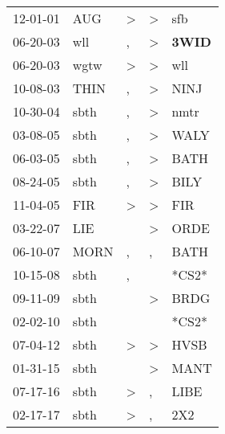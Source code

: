 \begin{supertabular}{p{0.07\textwidth}p{0.06\textwidth}p{0.02\textwidth}p{0.02\textwidth}p{0.06\textwidth}}
 12-01-01\textsuperscript{} &   AUG\textsuperscript{} &  \textgreater &  \textgreater &            sfb\textsuperscript{} \\
 06-20-03\textsuperscript{} &   wll\textsuperscript{} &             , &  \textgreater &  \textbf{3WID\textsuperscript{}} \\
 06-20-03\textsuperscript{} &  wgtw\textsuperscript{} &  \textgreater &  \textgreater &            wll\textsuperscript{} \\
 10-08-03\textsuperscript{} &  THIN\textsuperscript{} &             , &  \textgreater &           NINJ\textsuperscript{} \\
 10-30-04\textsuperscript{} &  sbth\textsuperscript{} &             , &  \textgreater &           nmtr\textsuperscript{} \\
 03-08-05\textsuperscript{} &  sbth\textsuperscript{} &             , &  \textgreater &           WALY\textsuperscript{} \\
 06-03-05\textsuperscript{} &  sbth\textsuperscript{} &             , &  \textgreater &           BATH\textsuperscript{} \\
 08-24-05\textsuperscript{} &  sbth\textsuperscript{} &             , &  \textgreater &           BILY\textsuperscript{} \\
 11-04-05\textsuperscript{} &   FIR\textsuperscript{} &  \textgreater &  \textgreater &            FIR\textsuperscript{} \\
 03-22-07\textsuperscript{} &   LIE\textsuperscript{} &               &  \textgreater &           ORDE\textsuperscript{} \\
 06-10-07\textsuperscript{} &  MORN\textsuperscript{} &             , &             , &           BATH\textsuperscript{} \\
 10-15-08\textsuperscript{} &  sbth\textsuperscript{} &             , &               &                            *CS2* \\
 09-11-09\textsuperscript{} &  sbth\textsuperscript{} &               &  \textgreater &           BRDG\textsuperscript{} \\
 02-02-10\textsuperscript{} &  sbth\textsuperscript{} &               &               &                            *CS2* \\
 07-04-12\textsuperscript{} &  sbth\textsuperscript{} &  \textgreater &  \textgreater &           HVSB\textsuperscript{} \\
 01-31-15\textsuperscript{} &  sbth\textsuperscript{} &               &  \textgreater &           MANT\textsuperscript{} \\
 07-17-16\textsuperscript{} &  sbth\textsuperscript{} &  \textgreater &             , &           LIBE\textsuperscript{} \\
 02-17-17\textsuperscript{} &  sbth\textsuperscript{} &  \textgreater &             , &            2X2\textsuperscript{} \\
\end{supertabular}
